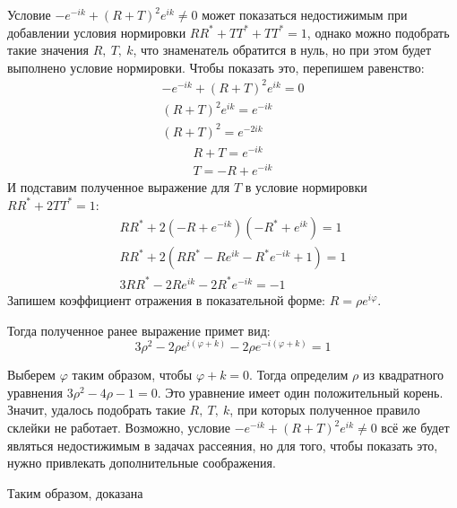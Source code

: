 \documentclass[a4 paper, 12 pt]{extarticle}
\begin{document}
   Условие $-e^{-ik} + \left(R+T\right)^2 e^{ik} \neq 0$ может показаться недостижимым при добавлении условия нормировки $RR^* +TT^* +TT^* = 1$, однако можно подобрать такие значения $R, \ T, \ k$, что знаменатель обратится в нуль, но при этом будет выполнено условие нормировки. Чтобы показать это, перепишем равенство:
   \begin{eqnarray*}
   -e^{-ik} + \left(R+T\right)^2 e^{ik} = 0 \\
   \left(R+T\right)^2 e^{ik} = e^{-ik} \\
   \left(R+T\right)^2 = e^{-2ik}
   \end{eqnarray*}
   \begin{eqnarray*}
   R+T = e^{-ik} \\
   T = -R + e^{-ik}
   \end{eqnarray*}
   И подставим полученное выражение для $T$ в условие нормировки $RR^* + 2TT^* = 1$:
   \begin{eqnarray*}
   RR^* + 2\left(-R + e^{-ik}\right)\left(-R^* + e^{ik}\right) = 1\\
      RR^* + 2\left(RR^* -Re^{ik} -R^*e^{-ik} + 1\right) = 1\\
   3RR^* -2Re^{ik}-2R^*e^{-ik} = -1
   \end{eqnarray*}
   Запишем коэффициент отражения в показательной форме: $R = \rho e^{i \varphi}$.
   
   Тогда полученное ранее выражение примет вид:
   \[
   3 \rho^2 -2 \rho e^{i\left(\varphi+k\right)} -2 \rho e^{-i\left(\varphi+k\right)} = 1
   \]
   
   Выберем $\varphi$ таким образом, чтобы $\varphi + k = 0$. Тогда определим $\rho$ из квадратного уравнения $3\rho^2 -4\rho -1 = 0$.
   Это уравнение имеет один положительный корень. Значит, удалось подобрать такие $R, \ T, \ k$, при которых полученное правило склейки не работает. Возможно, условие $-e^{-ik} + \left(R+T\right)^2 e^{ik} \neq 0$ всё же будет являться недостижимым в задачах рассеяния, но для того, чтобы показать это, нужно привлекать дополнительные соображения.
   
   Таким образом, доказана
   
\end{document}
